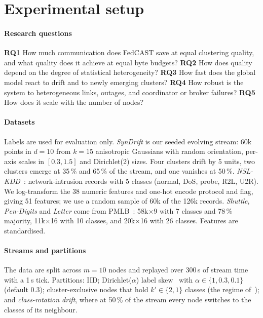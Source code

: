 \section{Experimental setup}\label{sec:setup}

\paragraph{Research questions} \textbf{RQ1} How much communication does FedCAST save at equal clustering quality, and what quality does it achieve at equal byte budgets? \textbf{RQ2} How does quality depend on the degree of statistical heterogeneity? \textbf{RQ3} How fast does the global model react to drift and to newly emerging clusters? \textbf{RQ4} How robust is the system to heterogeneous links, outages, and coordinator or broker failures? \textbf{RQ5} How does it scale with the number of nodes?

\paragraph{Datasets} Labels are used for evaluation only. \emph{SynDrift} is our seeded evolving stream: 60k points in $d{=}10$ from $k{=}15$ anisotropic Gaussians with random orientation, per-axis scales in $[0.3,1.5]$ and Dirichlet(2) sizes. Four clusters drift by 5 units, two clusters emerge at 35\,\% and 65\,\% of the stream, and one vanishes at 50\,\%. \emph{NSL-KDD}~\cite{tavallaee2009nslkdd}: network-intrusion records with 5 classes (normal, DoS, probe, R2L, U2R). We log-transform the 38 numeric features and one-hot encode protocol and flag, giving 51 features; we use a random sample of 60k of the 126k records. \emph{Shuttle}, \emph{Pen-Digits} and \emph{Letter} come from PMLB~\cite{olson2017pmlb}: 58k$\times$9 with 7 classes and 78\,\% majority, 11k$\times$16 with 10 classes, and 20k$\times$16 with 26 classes. Features are standardised.

\paragraph{Streams and partitions} The data are split across $m{=}10$ nodes and replayed over 300\,s of stream time with a 1\,s tick. Partitions: IID; Dirichlet($\alpha$) label skew~\cite{hsu2019noniid} with $\alpha\in\{1,0.3,0.1\}$ (default $0.3$); cluster-exclusive nodes that hold $k'\in\{2,1\}$ classes (the regime of~\cite{dennis2021kfed}); and \emph{class-rotation drift}, where at 50\,\% of the stream every node switches to the classes of its neighbour.

